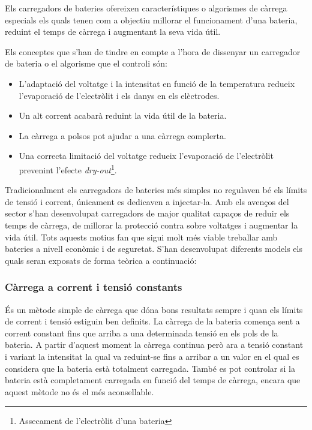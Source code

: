 Els carregadors de bateries ofereixen característiques o algorismes de \newline càrrega especials els quals tenen com a objectiu millorar el funcionament d'una bateria, reduint el temps de càrrega i augmentant la seva vida útil.

Els conceptes que s'han de tindre en compte a l'hora de dissenyar un carregador de bateria o el algorisme que el controli són:

\begin{itemize}
    \item L'adaptació del voltatge i la intensitat en funció de la temperatura redueix l'evaporació de l'electròlit i els danys en els elèctrodes.
    \item Un alt corrent acabarà reduint la vida útil de la bateria.
    \item La càrrega a polsos pot ajudar a una càrrega complerta.
    \item Una correcta limitació del voltatge redueix l'evaporació de l'electròlit prevenint l'efecte \textit{dry-out}\footnote{Assecament de l'electròlit d'una bateria}.
\end{itemize}

Tradicionalment els carregadors de bateries més simples no regulaven bé els límits de tensió i corrent, únicament es dedicaven a injectar-la. Amb els avenços del sector s'han desenvolupat carregadors de major qualitat capaços de reduir els temps de càrrega, de millorar la protecció contra sobre voltatges i augmentar la vida útil. Tots aquests motius fan que sigui molt més viable treballar amb bateries a nivell econòmic i de seguretat. S'han desenvolupat diferents models els quals seran exposats de forma teòrica a continuació:

\subsubsection{Càrrega a corrent i tensió constants}
És un mètode simple de càrrega que dóna bons resultats sempre i quan els límits de corrent i tensió estiguin ben definits. La càrrega de la bateria comença sent a corrent constant fins que arriba a una determinada tensió en els pols de la bateria. A partir d'aquest moment la càrrega continua però ara a tensió constant i variant la intensitat la qual va reduint-se fins a arribar a un valor en el qual es considera que la bateria està totalment carregada. També es pot controlar si la bateria està completament carregada en funció del temps de càrrega, encara que aquest mètode no és el més aconsellable. 

